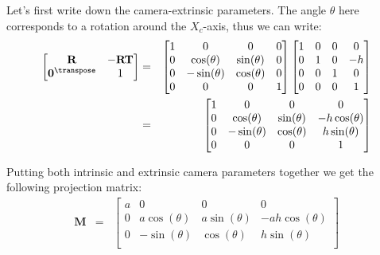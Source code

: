 Let's first write down the camera-extrinsic parameters. The angle $\theta$ here corresponds to a rotation around the $X_c$-axis, thus we can write:
\begin{eqnarray}
    \begin{bmatrix}
    \mathbf{R} & -\mathbf{R}\mathbf{T} \\
    \mathbf{0}^\transpose & 1
    \end{bmatrix}
    &=&        
    \begin{bmatrix}
    1 & 0 & 0 & 0 \\
    0 & \cos (\theta) & \sin (\theta) & 0 \\
    0 & -\sin (\theta) & \cos (\theta) & 0 \\
    0 & 0 & 0 & 1 \\
    \end{bmatrix}
    \begin{bmatrix}
    1 & 0 & 0 & 0 \\
    0 & 1 & 0 & -h \\
    0 & 0 & 1 & 0 \\
    0 & 0 & 0 & 1 \\
    \end{bmatrix}
    \\
    &=&
    \begin{bmatrix}
    1 & 0 & 0 & 0 \\
    0 & \cos (\theta) & \sin (\theta) & -h \cos (\theta) \\
    0 & -\sin (\theta) & \cos (\theta) & h \sin (\theta) \\
    0 & 0 & 0 & 1 \\
    \end{bmatrix}
    \label{eq:model3}
\end{eqnarray}

Putting both intrinsic and extrinsic camera parameters together we get the following projection matrix:
\begin{eqnarray}
    \mathbf{M} 
    &=& 
    \begin{bmatrix}
    a & 0 & 0 & 0 \\
    0 & a\cos (\theta) & a\sin (\theta) & -ah \cos (\theta) \\
    0 & -\sin (\theta) & \cos (\theta) & h \sin (\theta) \\
    \end{bmatrix}
    \label{eq:model3b}
\end{eqnarray}

